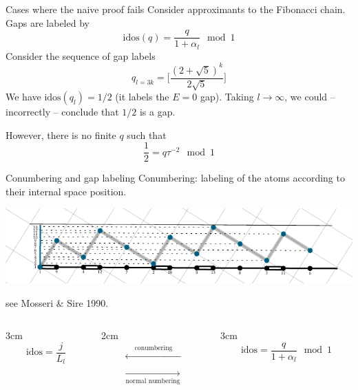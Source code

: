 \documentclass[xcolor=x11names,compress,professionalfonts]{beamer}
\renewcommand{\(}{\begin{columns}}
\renewcommand{\)}{\end{columns}}
\newcommand{\<}[1]{\begin{column}{#1}}
\renewcommand{\>}{\end{column}}
\newcommand{\id}{\ensuremath{\text{idos}}}
\begin{document}
\begin{frame}{Cases where the naive proof fails}
Consider approximants to the Fibonacci chain.
Gaps are labeled by
\[
	\id(q) = \frac{q}{1+\alpha_l} \mod 1
\]
Consider the sequence of gap labels
\[
	q_{l = 3k} = \Bigg[ \frac{(2+\sqrt{5})^k}{2 \sqrt{5}}\Bigg]
\]
We have $\id(q_l) = 1/2$ (it labels the $E=0$ gap).
Taking $l \to \infty$, we could -- incorrectly -- conclude that $1/2$ is a gap.

However, there is no finite $q$ such that
\[
	\frac{1}{2} = q \tau^{-2} \mod 1
\]

\end{frame}

\begin{frame}{Conumbering and gap labeling}
Conumbering: labeling of the atoms according to their internal space position.

{  \centering
     \includegraphics[scale=.9]{img/cut_and_project_perp_projections.pdf}

}
{\flushright
\small{see Mosseri \& Sire 1990.}

}
\(
\<{3cm}
\[
	\id = \frac{j}{L_l}
\]
\>

\<{2cm}
\begin{align*}
	\xleftarrow[]{\text{~~~~conumbering~~~~}} \\
	\xrightarrow[\text{normal numbering}]{}
\end{align*}
\>

\<{3cm}
\[
	\id = \frac{q}{1+\alpha_l} \mod 1
\]
\>
\)

\end{frame}
\end{document}
